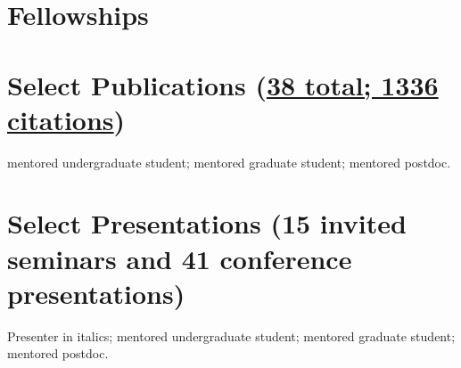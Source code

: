 \section*{Fellowships}


\section*{Select Publications (\href{https://scholar.google.com/citations?user=lz3wj6AAAAAJ&hl=en}{38 total; 1336 citations})}
\ugsymbol{}mentored undergraduate student;
\phdsymbol{}mentored graduate student;
\postdocsymbol{}mentored postdoc.

\nocite{*}
\printbibliography[filter=resumepapers, heading=none]

\section*{Select Presentations (15 invited seminars and 41 conference presentations)}
Presenter in italics;
\ugsymbol{}mentored undergraduate student;
\phdsymbol{}mentored graduate student;
\postdocsymbol{}mentored postdoc.

\nocite{*}
\printbibliography[filter=highlightedpresentations, heading=none]

